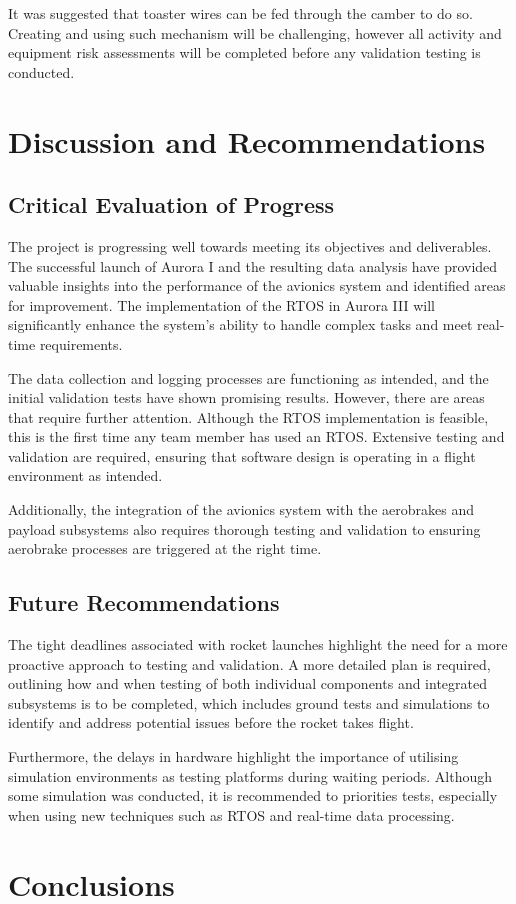 It was suggested that toaster wires can be fed through the camber to do so. Creating and using such mechanism will be challenging, however all activity and equipment risk assessments will be completed before any validation testing is conducted.  

\section{Discussion and Recommendations}

\subsection{Critical Evaluation of Progress}
The project is progressing well towards meeting its objectives and deliverables. The successful launch of Aurora I and the resulting data analysis have provided valuable insights into the performance of the avionics system and identified areas for improvement. The implementation of the RTOS in Aurora III will significantly enhance the system's ability to handle complex tasks and meet real-time requirements. 

The data collection and logging processes are functioning as intended, and the initial validation tests have shown promising results. However, there are areas that require further attention. Although the RTOS implementation is feasible, this is the first time any team member has used an RTOS. Extensive testing and validation are required, ensuring that software design is operating in a flight environment as intended. 

Additionally, the integration of the avionics system with the aerobrakes and payload subsystems also requires thorough testing and validation to ensuring aerobrake processes are triggered at the right time.  

\subsection{Future Recommendations}
The tight deadlines associated with rocket launches highlight the need for a more proactive approach to testing and validation. A more detailed plan is required, outlining how and when testing of both individual components and integrated subsystems is to be completed, which includes ground tests and simulations to identify and address potential issues before the rocket takes flight. 

Furthermore, the delays in hardware highlight the importance of utilising simulation environments as testing platforms during waiting periods. Although some simulation was conducted, it is recommended to priorities tests, especially when using new techniques such as RTOS and real-time data processing.  

\section{Conclusions}
